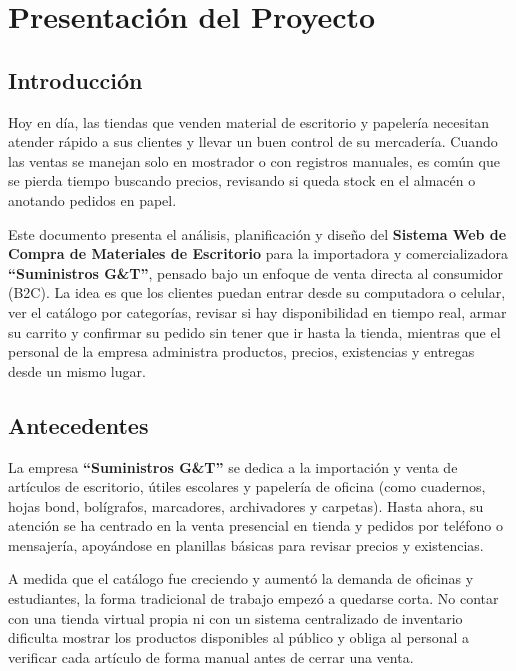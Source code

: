 \section{Presentación del Proyecto}

\subsection{Introducción}
Hoy en día, las tiendas que venden material de escritorio y papelería necesitan atender rápido a sus clientes y llevar un buen control de su mercadería. Cuando las ventas se manejan solo en mostrador o con registros manuales, es común que se pierda tiempo buscando precios, revisando si queda stock en el almacén o anotando pedidos en papel.

Este documento presenta el análisis, planificación y diseño del \textbf{Sistema Web de Compra de Materiales de Escritorio} para la importadora y comercializadora \textbf{``Suministros G\&T''}, pensado bajo un enfoque de venta directa al consumidor (B2C). La idea es que los clientes puedan entrar desde su computadora o celular, ver el catálogo por categorías, revisar si hay disponibilidad en tiempo real, armar su carrito y confirmar su pedido sin tener que ir hasta la tienda, mientras que el personal de la empresa administra productos, precios, existencias y entregas desde un mismo lugar.

\subsection{Antecedentes}
La empresa \textbf{``Suministros G\&T''} se dedica a la importación y venta de artículos de escritorio, útiles escolares y papelería de oficina (como cuadernos, hojas bond, bolígrafos, marcadores, archivadores y carpetas). Hasta ahora, su atención se ha centrado en la venta presencial en tienda y pedidos por teléfono o mensajería, apoyándose en planillas básicas para revisar precios y existencias.

A medida que el catálogo fue creciendo y aumentó la demanda de oficinas y estudiantes, la forma tradicional de trabajo empezó a quedarse corta. No contar con una tienda virtual propia ni con un sistema centralizado de inventario dificulta mostrar los productos disponibles al público y obliga al personal a verificar cada artículo de forma manual antes de cerrar una venta.

